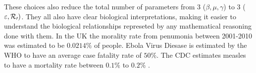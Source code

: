 These choices also reduce the total number of parameters from 3 ($\beta ,\mu ,\gamma$) to 3 ($\varepsilon ,\mathcal{R_0})$.
They all also have clear biological interpretations, making it easier to understand the biological relationships represeted by any mathematical reasoning done with them.
In the UK the morality rate from penumonia between 2001-2010 was estimated to be $0.0214\%$ of people\cite{pneu}.
Ebola Virus Diesase is estimated by the WHO to have an average case fatality rate of $50\%$\cite{ebola}.
The CDC estimates measles to have a mortality rate between $0.1\%$ to $0.2\%$ \cite{meas}.
